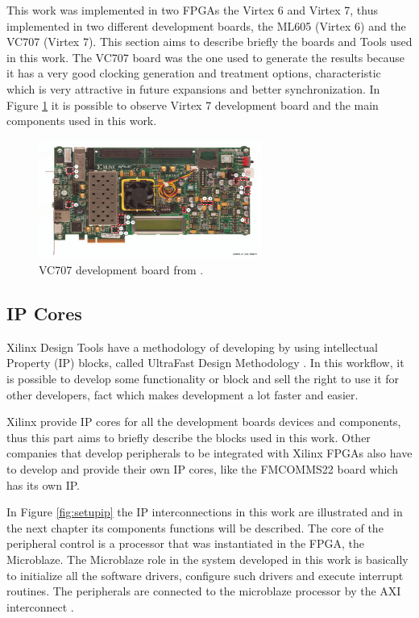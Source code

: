 This work was implemented in two FPGAs the Virtex 6 and Virtex 7, thus
implemented in two different development boards, the ML605 (Virtex 6) and the
VC707 (Virtex 7). This section aims to describe briefly the boards and Tools
used in this work. The VC707 board was the one used to generate the results
because it has a very good clocking generation and treatment options,
characteristic which is very attractive in future expansions and better
synchronization. In Figure \ref{fig:vc707} it is possible to observe Virtex 7
development board and the main components used in this work.

\begin{figure}[htbp]
    \centering
    \includegraphics[width=0.65\textwidth]{./figures/vc707}
    \caption{ VC707 development board from \cite{xilinx:vc707}.
    \label{fig:vc707}}
\end{figure}

\subsection{IP Cores}

Xilinx Design Tools have a methodology of developing by using intellectual
Property (IP) blocks, called UltraFast Design Methodology
\cite{xilinx:ultrafast}. In this workflow, it is possible to develop some
functionality or block and sell the right to use it for other developers, fact
which makes development a lot faster and easier.

Xilinx provide IP cores for all the development boards devices and components,
thus this part aims to briefly describe the blocks used in this work. Other
companies that develop peripherals to be integrated with Xilinx FPGAs also have
to develop and provide their own IP cores, like the FMCOMMS22 board which has its
own IP.

In Figure \ref{fig:setupip} the IP interconnections in this work are illustrated
and in the next chapter its components functions will be described. The core of
the peripheral control is a processor that was instantiated in the FPGA, the
Microblaze. The Microblaze role in the system developed in this work is
basically to initialize all the software drivers, configure such drivers and
execute interrupt routines. The peripherals are connected to the microblaze
processor by the AXI interconnect \cite{xilinx:axiconn}.

